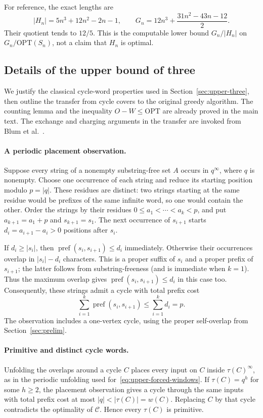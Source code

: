 \documentclass[11pt,a4paper]{article}   %
\theoremstyle{compact}
\theoremstyle{compactdef}
\newcommand{\OPT}{\mathrm{OPT}}
\newcommand{\GR}{G}                         %
\begin{document}
For reference, the exact lengths are
\[
 |H_n|=5n^3+12n^2-2n-1,\qquad
 \GR_n=12n^3+\frac{31n^2-43n-12}{2}.
\]
Their quotient tends to $12/5$. This is the computable lower bound
$\GR_n/|H_n|$ on $\GR_n/\OPT(S_n)$, not a claim that $H_n$ is optimal.

\subsection{Details of the upper bound of three}\label{app:upper}

We justify the classical cycle-word properties used in
Section~\ref{sec:upper-three}, then outline the transfer from cycle covers
to the original greedy algorithm. The counting lemma and the inequality
$O-W\le\OPT$ are already proved in the main text. The exchange and
charging arguments in the transfer are invoked from Blum et
al.~\cite[Section~5]{BJLTY94}.

\paragraph{A periodic placement observation.}
Suppose every string of a nonempty substring-free set $A$ occurs in
$q^\infty$, where $q$ is nonempty. Choose one occurrence of each string
and reduce its starting position modulo $p=|q|$. These residues are
distinct: two strings starting at the same residue would be prefixes of
the same infinite word, so one would contain the other. Order the strings
by their residues $0\le a_1<\cdots<a_k<p$, and put $a_{k+1}=a_1+p$ and
$s_{k+1}=s_1$. The next occurrence of $s_{i+1}$ starts
$d_i=a_{i+1}-a_i>0$ positions after $s_i$.

If $d_i\ge|s_i|$, then $\operatorname{pref}(s_i,s_{i+1})\le d_i$
immediately. Otherwise their occurrences overlap in $|s_i|-d_i$
characters. This is a proper suffix of $s_i$ and a proper prefix of
$s_{i+1}$; the latter follows from substring-freeness (and is immediate
when $k=1$). Thus the maximum overlap gives
$\operatorname{pref}(s_i,s_{i+1})\le d_i$ in this case too. Consequently,
these strings admit a cycle with total prefix cost
\[
 \sum_{i=1}^k\operatorname{pref}(s_i,s_{i+1})
 \le\sum_{i=1}^kd_i=p.
\]
The observation includes a one-vertex cycle, using the proper
self-overlap from Section~\ref{sec:prelim}.

\paragraph{Primitive and distinct cycle words.}
Unfolding the overlaps around a cycle $C$ places every input on $C$
inside $\tau(C)^\infty$, as in the periodic unfolding used
for~\eqref{eq:upper-forced-windows}. If
$\tau(C)=q^h$ for some $h\ge2$, the placement observation gives a cycle
through the same inputs with total prefix cost at most
$|q|<|\tau(C)|=w(C)$. Replacing $C$ by that cycle contradicts the
optimality of $\mathcal C$. Hence every $\tau(C)$ is primitive.
\end{document}
